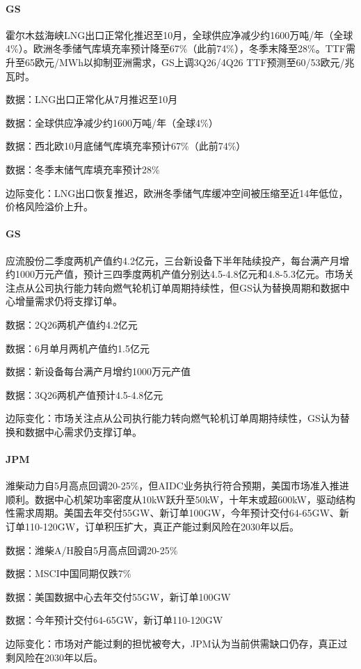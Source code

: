 \documentclass[11pt]{ctexart}
\begin{document}
\paragraph{GS} 霍尔木兹海峡LNG出口正常化推迟至10月，全球供应净减少约1600万吨/年（全球4\%）。欧洲冬季储气库填充率预计降至67\%（此前74\%），冬季末降至28\%。TTF需升至65欧元/MWh以抑制亚洲需求，GS上调3Q26/4Q26 TTF预测至60/53欧元/兆瓦时。
{\small\color{refgray}数据：LNG出口正常化从7月推迟至10月\par}
{\small\color{refgray}数据：全球供应净减少约1600万吨/年（全球4\%）\par}
{\small\color{refgray}数据：西北欧10月底储气库填充率预计67\%（此前74\%）\par}
{\small\color{refgray}数据：冬季末储气库填充率预计28\%\par}
{\small\color{refgray}边际变化：LNG出口恢复推迟，欧洲冬季储气库缓冲空间被压缩至近14年低位，价格风险溢价上升。\par}
\paragraph{GS} 应流股份二季度两机产值约4.2亿元，三台新设备下半年陆续投产，每台满产月增约1000万元产值，预计三四季度两机产值分别达4.5-4.8亿元和4.8-5.3亿元。市场关注点从公司执行能力转向燃气轮机订单周期持续性，但GS认为替换周期和数据中心增量需求仍将支撑订单。
{\small\color{refgray}数据：2Q26两机产值约4.2亿元\par}
{\small\color{refgray}数据：6月单月两机产值约1.5亿元\par}
{\small\color{refgray}数据：新设备每台满产月增约1000万元产值\par}
{\small\color{refgray}数据：3Q26两机产值预计4.5-4.8亿元\par}
{\small\color{refgray}边际变化：市场关注点从公司执行能力转向燃气轮机订单周期持续性，GS认为替换和数据中心需求仍支撑订单。\par}
\paragraph{JPM} 潍柴动力自5月高点回调20-25\%，但AIDC业务执行符合预期，美国市场准入推进顺利。数据中心机架功率密度从10kW跃升至50kW，十年末或超600kW，驱动结构性需求周期。美国去年交付55GW、新订单100GW，今年预计交付64-65GW、新订单110-120GW，订单积压扩大，真正产能过剩风险在2030年以后。
{\small\color{refgray}数据：潍柴A/H股自5月高点回调20-25\%\par}
{\small\color{refgray}数据：MSCI中国同期仅跌7\%\par}
{\small\color{refgray}数据：美国数据中心去年交付55GW，新订单100GW\par}
{\small\color{refgray}数据：今年预计交付64-65GW，新订单110-120GW\par}
{\small\color{refgray}边际变化：市场对产能过剩的担忧被夸大，JPM认为当前供需缺口仍存，真正过剩风险在2030年以后。\par}
\end{document}
